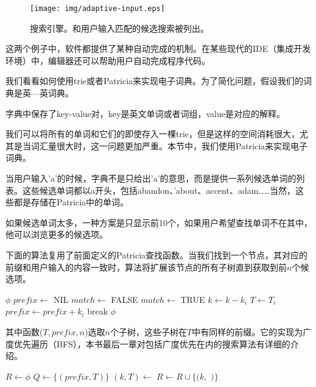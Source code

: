 \documentclass[UTF8]{article}
\begin{document}
\begin{figure}[htbp]
  \centering
  \texttt{[image: img/adaptive-input.eps]}
  \caption{搜索引擎。和用户输入匹配的候选搜索被列出。}
  \label{fig:word-completion}
\end{figure}

这两个例子中，软件都提供了某种自动完成的机制。在某些现代的IDE（集成开发环境）中，编辑器还可以帮助用户自动完成程序代码。

我们看看如何使用trie或者Patricia来实现电子词典。为了简化问题，假设我们的词典是英—英词典。

字典中保存了key-value对，key是英文单词或者词组，value是对应的解释。

我们可以将所有的单词和它们的即使存入一棵trie，但是这样的空间消耗很大，尤其是当词汇量很大时，这一问题更加严重。本节中，我们使用Patricia来实现电子词典。

当用户输入'a'的时候，字典不是只给出'a'的意思，而是提供一系列候选单词的列表。这些候选单词都以a开头，包括abandon、'about、accent、adam……当然，这些都是存储在Patricia中的单词。

如果候选单词太多，一种方案是只显示前10个，如果用户希望查找单词不在其中，他可以浏览更多的候选项。

下面的算法复用了前面定义的Patricia查找函数。当我们找到一个节点，其对应的前缀和用户输入的内容一致时，算法将扩展该节点的所有子树直到获取到前$n$个候选项。

\begin{algorithmic}[1]
     \State \Return $\phi$
  \EndIf
  \State $prefix \gets$ NIL
  \Repeat
    \State $match \gets$ FALSE
        \State \Return {}
      \EndIf
        \State $match \gets$ TRUE
        \State $k \gets k - k_i$
        \State $T \gets T_i$
        \State $prefix \gets prefix + k_i$
        \State break
      \EndIf
    \EndFor
  \State \Return $\phi$
\EndFunction
\end{algorithmic}

其中函数($T, prefix, n$)选取$n$个子树，这些子树在$T$中有同样的前缀。它的实现为广度优先遍历（BFS），本书最后一章对包括广度优先在内的搜索算法有详细的介绍。

\begin{algorithmic}[1]
  \State $R \gets \phi$
  \State $Q \gets \{(prefix, T)\}$
    \State $(k, T) \gets$ 
      \State $R \gets R \cup \{(k, $  $)\}$
    \EndIf
      \State {}
    \EndFor
  \EndWhile
\EndFunction
\end{algorithmic}
\end{document}
